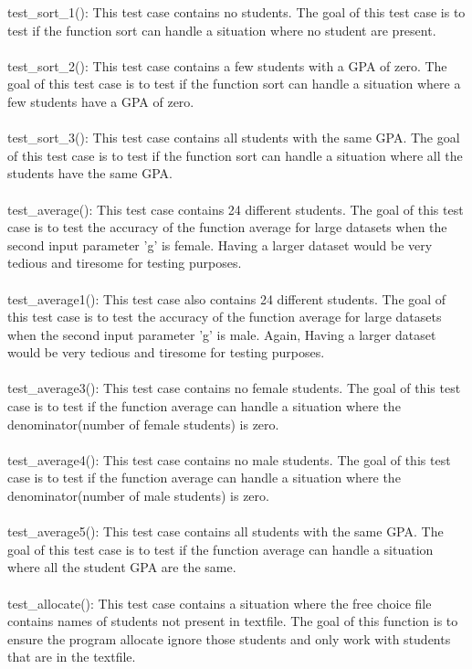 \documentclass[12pt]{article}
\begin{document}
test\_sort\_1(): This test case contains no students. The goal of this test case is to test if the function sort can handle a situation where no student are present.\\\\
test\_sort\_2(): This test case contains a few students with a GPA of zero. The goal of this test case is to test if the function sort can handle a situation where a few students have a GPA of zero.\\\\
test\_sort\_3(): This test case contains all students with the same GPA. The goal of this test case is to test if the function sort can handle a situation where all the students have the same GPA.\\\\
test\_average(): This test case contains 24 different students. The goal of this test case is to test the accuracy of the function average for large datasets when the second input parameter 'g' is female. Having a larger dataset would be very tedious and tiresome for testing purposes.\\\\
test\_average1(): This test case also contains 24 different students. The goal of this test case is to test the accuracy of the function average for large datasets when the second input parameter 'g' is male. Again, Having a larger dataset would be very tedious and tiresome for testing purposes.\\\\
test\_average3(): This test case contains no female students. The goal of this test case is to test if the function average can handle a situation where the denominator(number of female students) is zero.\\\\
test\_average4(): This test case contains no male students. The goal of this test case is to test if the function average can handle a situation where the denominator(number of male students) is zero.\\\\
test\_average5(): This test case contains all students with the same GPA. The goal of this test case is to test if the function average can handle a situation where all the student GPA are the same.\\\\
test\_allocate(): This test case contains a situation where the free choice file contains names of students not present in textfile. The goal of this function is to ensure the program allocate ignore those students and only work with students that are in the textfile.\\ \\
\end{document}
